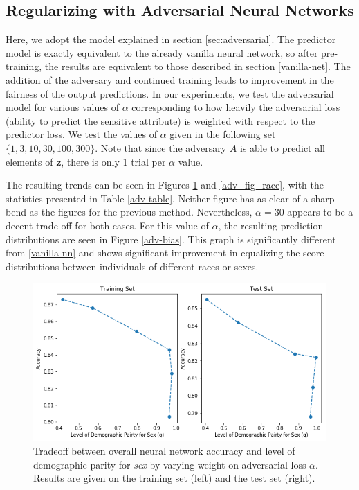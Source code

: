 \documentclass{article}
\newcommand{\bd}[1]{\boldsymbol{#1}}
\begin{document}
\subsection{Regularizing with Adversarial Neural Networks}
Here, we adopt the model explained in section \ref{sec:adversarial}. The predictor model is exactly equivalent to the already vanilla neural network, so after pre-training, the results are equivalent to those described in section \ref{vanilla-net}. The addition of the adversary and continued training leads to improvement in the fairness of the output predictions. In our experiments, we test the adversarial model for various values of $\alpha$ corresponding to how heavily the adversarial loss (ability to predict the sensitive attribute) is weighted with respect to the predictor loss. We test the values of $\alpha$ given in the following set $\{1, 3, 10, 30, 100, 300 \}$. Note that since the adversary $A$ is able to predict all elements of $\bd z$, there is only 1 trial per $\alpha$ value. 

The resulting trends can be seen in Figures \ref{adv_fig_sex} and \ref{adv_fig_race}, with the statistics presented in Table \ref{adv-table}. Neither figure has as clear of a sharp bend as the figures for the previous method. Nevertheless, $\alpha=30$ appears to be a decent trade-off for both cases. For this value of $\alpha$, the resulting prediction distributions are seen in Figure \ref{adv-bias}. This graph is significantly different from \ref{vanilla-nn} and shows significant improvement in equalizing the score distributions between individuals of different races or sexes. 

\begin{figure}[ht]
	\vskip 0.2in
	\begin{center}
		\centerline{\includegraphics[width=\columnwidth]{img/adv_levels_sex.png}}
		\caption{Tradeoff between overall neural network accuracy and level of demographic parity for \emph{sex} by varying weight on adversarial loss $\alpha$. Results are given on the training set (left) and the test set (right).}
		\label{adv_fig_sex}
	\end{center}
	\vskip -0.2in
\end{figure}
\end{document}
